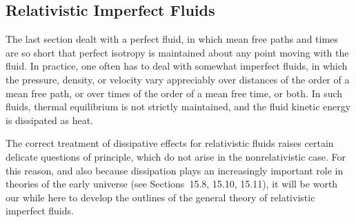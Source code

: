 
\subsection{Relativistic Imperfect Fluids\optionalreading}\label{sec:2.11}
\begingroup
\renewcommand\thefootnote{*}
\endgroup

The last section dealt with a perfect fluid, in which mean free paths and times
are so short that perfect isotropy is maintained about any point moving with the
fluid. In practice, one often has to deal with somewhat imperfect fluids, in
which the pressure, density, or velocity vary appreciably over distances of the
order of a mean free path, or over times of the order of a mean free time, or
both. In such fluids, thermal equilibrium is not strictly maintained, and the
fluid kinetic energy is dissipated as heat.

The correct treatment of dissipative effects for relativistic fluids raises
certain delicate questions of principle, which do not arise in the
nonrelativistic case. For this reason, and also because dissipation plays an
increasingly important role in theories of the early universe (see
Sections~15.8, 15.10, 15.11), it will be worth our while here to develop the
outlines of the general theory of relativistic imperfect fluids.

